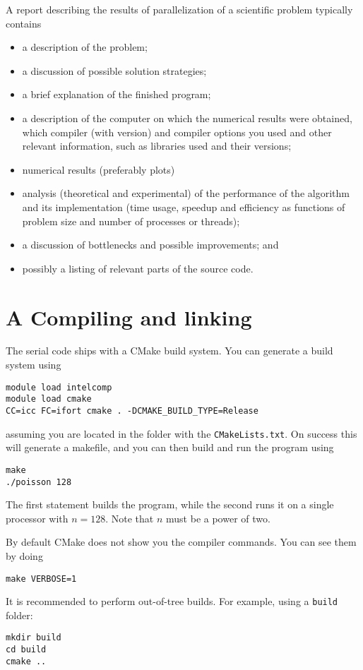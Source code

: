 \documentclass[onecolumn, oneside, a4paper, 11pt]{memoir}
\theoremstyle{remark}
\begin{document}
A report describing the results of parallelization of a scientific problem
typically contains
\begin{itemize}
\item a description of the problem;
\item a discussion of possible solution strategies;
\item a brief explanation of the finished program;
\item a description of the computer on which the numerical results were
  obtained, which compiler (with version) and compiler options you used and
  other relevant information, such as libraries used and their versions;
\item numerical results (preferably plots)
\item analysis (theoretical and experimental) of the performance of the
  algorithm and its implementation (time usage, speedup and efficiency as
  functions of problem size and number of processes or threads);
\item a discussion of bottlenecks and possible improvements; and
\item possibly a listing of relevant parts of the source code.
\end{itemize}

\section{A \quad Compiling and linking}

The serial code ships with a CMake build system. You can generate a build system
using
\begin{lstlisting}
module load intelcomp
module load cmake
CC=icc FC=ifort cmake . -DCMAKE_BUILD_TYPE=Release
\end{lstlisting}
assuming you are located in the folder with the \texttt{CMakeLists.txt}. On
success this will generate a makefile, and you can then build and run the
program using
\begin{lstlisting}
make
./poisson 128
\end{lstlisting}
The first statement builds the program, while the second runs it on a single
processor with $n=128$. Note that $n$ must be a power of two.

By default CMake does not show you the compiler commands. You can see them by doing
\begin{lstlisting}
make VERBOSE=1
\end{lstlisting}

It is recommended to perform out-of-tree builds. For example, using a
\texttt{build} folder:
\begin{lstlisting}
mkdir build
cd build
cmake ..
\end{lstlisting}
\end{document}
